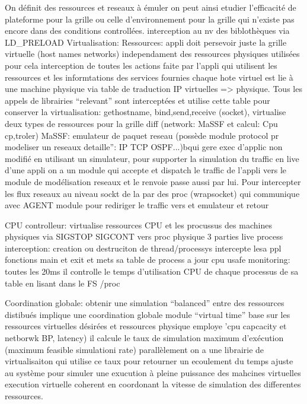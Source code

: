 On définit des ressources et reseaux à émuler on peut ainsi etudier l'efficacité de plateforme  pour la grille ou celle d'environnement pour la grille qui n'existe pas encore dans des conditions controllées.
interception au nv des biblothèques via LD\_PRELOAD
Virtualisation:
Ressources:
appli doit persevoir juste la grille virtuelle (host names networks) independament des ressources physiques utilisées pour cela interception de toutes les actions faite par l'appli qui utilisent les ressources et les informtations des services fournies 
chaque hote virtuel est lie à une machine physique via table de traduction IP virtuelles => physique. Tous les appels de librairies ``relevant'' sont interceptées et utilise cette table pour conserver la virtualisation: gethostname, bind,send,receive (socket), %
virtualise deux types de ressources pour la grille diff (network: MaSSF et calcul: Cpu cp,troler)
MaSSF:
 emulateur de paquet reseau (possède module protocol pr modeliser un reseaux detaille'': IP TCP OSPF...)bqui gere exec d'applic non modifié en utilisant un simulateur,
pour supporter la simulation du traffic en live d'une appli on a un module qui accepte et dispatch le traffic  de l'appli vers le module de modélisation reseaux et le renvoie passe aussi par lui. Pour intercepter les flux reseaux au niveau sockt de la par des proc (wrapsocket) qui communique avec AGENT module pour rediriger le traffic vers et emulateur et retour

CPU controlleur:
virtualise ressources CPU  et les procussus des machines physiques via SIGSTOP SIGCONT vers proc physique
3 parties
live process interception: creation ou destruciton de thread/processys intercepte lesa ppl fonctions main et exit et mets sa table de process a jour
cpu usafe monitoring: toutes les 20ms il controlle le temps d'utilisation CPU de chaque processus de sa table en lisant dans le FS /proc

Coordination globale:
obtenir une simulation ``balanced'' entre des ressources distibués implique une coordination globale
module ``virtual time'' base sur les ressources virtuelles désirées et ressources physique employe 'cpu capcacity et netborwk BP, latency) il calcule le taux de simulation maximum d'exécution (maximum feasible simulationi rate)
parallèlement on a une librairie de virtualisaiton qui utilise ce taux pour retourner un ecoulement du temps ajuste au système pour simuler une exucution à pleine puissance des mahcines virtuelles
execution virtuelle coherent en coordonant la vitesse de simulation des differentes ressources.

